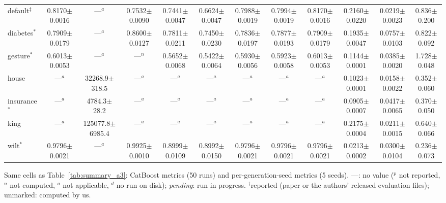 \begin{table}[t]
{\begin{tabular}{lccccccccccc}
default$^\ddagger$ & 0.8170{\scriptsize$\pm$0.0016} & ---$^{a}$ & 0.7532{\scriptsize$\pm$0.0090} & 0.7441{\scriptsize$\pm$0.0047} & 0.6624{\scriptsize$\pm$0.0047} & 0.7988{\scriptsize$\pm$0.0019} & 0.7994{\scriptsize$\pm$0.0019} & 0.8170{\scriptsize$\pm$0.0016} & 0.2160{\scriptsize$\pm$0.0220} & 0.0219{\scriptsize$\pm$0.0023} & 0.836{\scriptsize$\pm$0.200} \\
diabetes$^{*}$ & 0.7909{\scriptsize$\pm$0.0179} & ---$^{a}$ & 0.8600{\scriptsize$\pm$0.0127} & 0.7811{\scriptsize$\pm$0.0211} & 0.7450{\scriptsize$\pm$0.0230} & 0.7836{\scriptsize$\pm$0.0197} & 0.7877{\scriptsize$\pm$0.0193} & 0.7909{\scriptsize$\pm$0.0179} & 0.1935{\scriptsize$\pm$0.0047} & 0.0757{\scriptsize$\pm$0.0103} & 0.822{\scriptsize$\pm$0.092} \\
gesture$^{*}$ & 0.6013{\scriptsize$\pm$0.0053} & ---$^{a}$ & ---$^{n}$ & 0.5652{\scriptsize$\pm$0.0068} & 0.5422{\scriptsize$\pm$0.0064} & 0.5930{\scriptsize$\pm$0.0056} & 0.5923{\scriptsize$\pm$0.0058} & 0.6013{\scriptsize$\pm$0.0053} & 0.1144{\scriptsize$\pm$0.0001} & 0.0385{\scriptsize$\pm$0.0020} & 1.728{\scriptsize$\pm$0.048} \\
house & ---$^{a}$ & 32268.9{\scriptsize$\pm$318.5} & ---$^{a}$ & ---$^{a}$ & ---$^{a}$ & ---$^{a}$ & ---$^{a}$ & ---$^{a}$ & 0.1023{\scriptsize$\pm$0.0001} & 0.0158{\scriptsize$\pm$0.0022} & 0.352{\scriptsize$\pm$0.060} \\
insurance$^{*}$ & ---$^{a}$ & 4784.3{\scriptsize$\pm$28.2} & ---$^{a}$ & ---$^{a}$ & ---$^{a}$ & ---$^{a}$ & ---$^{a}$ & ---$^{a}$ & 0.0905{\scriptsize$\pm$0.0007} & 0.0417{\scriptsize$\pm$0.0065} & 0.370{\scriptsize$\pm$0.050} \\
king & ---$^{a}$ & 125077.8{\scriptsize$\pm$6985.4} & ---$^{a}$ & ---$^{a}$ & ---$^{a}$ & ---$^{a}$ & ---$^{a}$ & ---$^{a}$ & 0.2175{\scriptsize$\pm$0.0004} & 0.0211{\scriptsize$\pm$0.0015} & 0.640{\scriptsize$\pm$0.066} \\
wilt$^{*}$ & 0.9796{\scriptsize$\pm$0.0021} & ---$^{a}$ & 0.9925{\scriptsize$\pm$0.0010} & 0.8999{\scriptsize$\pm$0.0109} & 0.8992{\scriptsize$\pm$0.0150} & 0.9796{\scriptsize$\pm$0.0021} & 0.9796{\scriptsize$\pm$0.0021} & 0.9796{\scriptsize$\pm$0.0021} & 0.0213{\scriptsize$\pm$0.0002} & 0.0300{\scriptsize$\pm$0.0104} & 0.236{\scriptsize$\pm$0.073} \\
\bottomrule
\end{tabular}}
\par\smallskip\footnotesize Same cells as Table~\ref{tab:summary_a3}: CatBoost metrics (50 runs) and per-generation-seed metrics (5 seeds). ---: no value ($^{p}$ not reported, $^{n}$ not computed, $^{a}$ not applicable, $^{d}$ no run on disk); \emph{pending}: run in progress. $^\dagger$reported (paper or the authors' released evaluation files); unmarked: computed by us.
\end{table}

